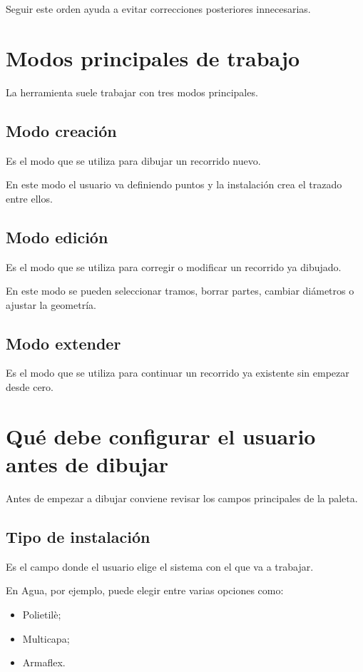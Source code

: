 Seguir este orden ayuda a evitar correcciones posteriores innecesarias.

\section{Modos principales de trabajo}

La herramienta suele trabajar con tres modos principales.

\subsection{Modo creación}

Es el modo que se utiliza para dibujar un recorrido nuevo.

En este modo el usuario va definiendo puntos y la instalación crea el trazado entre ellos.

\subsection{Modo edición}

Es el modo que se utiliza para corregir o modificar un recorrido ya dibujado.

En este modo se pueden seleccionar tramos, borrar partes, cambiar diámetros o ajustar la geometría.

\subsection{Modo extender}

Es el modo que se utiliza para continuar un recorrido ya existente sin empezar desde cero.

\section{Qué debe configurar el usuario antes de dibujar}

Antes de empezar a dibujar conviene revisar los campos principales de la paleta.

\subsection{Tipo de instalación}

Es el campo donde el usuario elige el sistema con el que va a trabajar.

En Agua, por ejemplo, puede elegir entre varias opciones como:

\begin{itemize}
\item Polietilè;
\item Multicapa;
\item Armaflex.
\end{itemize}

